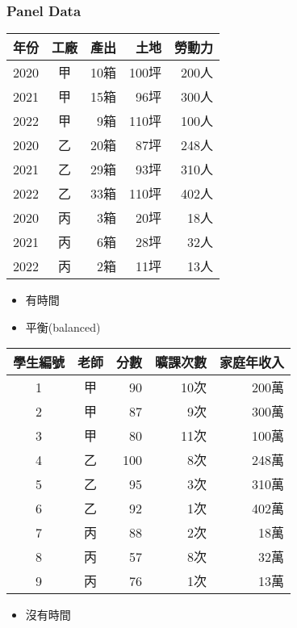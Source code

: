 \begin{frame}
    \frametitle{Panel Data}

    \begin{table}
        \begin{tabular}{c c | r r r}
            年份 & 工廠 & 產出 & 土地 & 勞動力 \\
            \hline \hline
            2020 & 甲 & 10箱 & 100坪 & 200人 \\
            2021 & 甲 & 15箱 & 96坪 & 300人 \\
            2022 & 甲 & 9箱 & 110坪 & 100人 \\
            \hline
            2020 & 乙 & 20箱 & 87坪 & 248人 \\
            2021 & 乙 & 29箱 & 93坪 & 310人 \\
            2022 & 乙 & 33箱 & 110坪 & 402人 \\
            \hline
            2020 & 丙 & 3箱 & 20坪 & 18人 \\
            2021 & 丙 & 6箱 & 28坪 & 32人 \\
            2022 & 丙 & 2箱 & 11坪 & 13人 \\
        \end{tabular}
    \end{table}
    \begin{itemize}
        \item 有時間
        \item 平衡(balanced)
    \end{itemize}
\end{frame}

\begin{frame}
    \begin{table}
        \begin{tabular}{c c | r r r}
            學生編號 & 老師 & 分數 & 曠課次數 & 家庭年收入 \\
            \hline \hline
            1 & 甲 & 90 & 10次 & 200萬 \\
            2 & 甲 & 87 & 9次 & 300萬 \\
            3 & 甲 & 80 & 11次 & 100萬 \\
            \hline
            4 & 乙 & 100 & 8次 & 248萬 \\
            5 & 乙 & 95 & 3次 & 310萬 \\
            6 & 乙 & 92 & 1次 & 402萬 \\
            \hline
            7 & 丙 & 88 & 2次 & 18萬 \\
            8 & 丙 & 57 & 8次 & 32萬 \\
            9 & 丙 & 76 & 1次 & 13萬 \\
        \end{tabular}
    \end{table}
    \begin{itemize}
        \item 沒有時間
    \end{itemize}
\end{frame}

